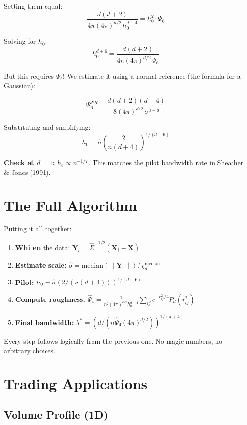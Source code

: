 \documentclass[12pt]{article}
\newcommand{\note}[1]{\begin{tcolorbox}[colback=yellow!5,colframe=yellow!60!black,breakable]\small #1\end{tcolorbox}}
\begin{document}
Setting them equal:
$$\frac{d(d+2)}{4n(4\pi)^{d/2}\,h_0^{d+4}} = h_0^2 \cdot \Psi_6$$

Solving for $h_0$:
$$h_0^{d+6} = \frac{d(d+2)}{4n(4\pi)^{d/2}\,\Psi_6}$$

But this requires $\Psi_6$! We estimate it using a normal reference (the formula for a Gaussian):

$$\Psi_6^{NR} = \frac{d(d+2)(d+4)}{8(4\pi)^{d/2}\,\sigma^{d+6}}$$

Substituting and simplifying:
$$\boxed{h_0 = \hat\sigma\left(\frac{2}{n(d+4)}\right)^{1/(d+6)}}$$

\note{
\textbf{Check at $d=1$:} $h_0 \propto n^{-1/7}$. This matches the pilot bandwidth rate in Sheather \& Jones (1991). \checkmark
}

\section{The Full Algorithm}

Putting it all together:

\begin{enumerate}
\item \textbf{Whiten} the data: $\mathbf{Y}_i = \hat\Sigma^{-1/2}(\mathbf{X}_i - \bar{\mathbf{X}})$
\item \textbf{Estimate scale:} $\hat\sigma = \text{median}(\|\mathbf{Y}_i\|) / \chi_d^{\text{median}}$
\item \textbf{Pilot:} $h_0 = \hat\sigma(2/(n(d+4)))^{1/(d+6)}$
\item \textbf{Compute roughness:} $\hat\Psi_4 = \frac{1}{n^2(4\pi)^{d/2}h_0^{d+4}}\sum_{ij}e^{-r_{ij}^2/4}P_d(r_{ij}^2)$
\item \textbf{Final bandwidth:} $h^* = (d/(n\hat\Psi_4(4\pi)^{d/2}))^{1/(d+4)}$
\end{enumerate}

Every step follows logically from the previous one. No magic numbers, no arbitrary choices.

\section{Trading Applications}

\subsection{Volume Profile (1D)}
\end{document}
